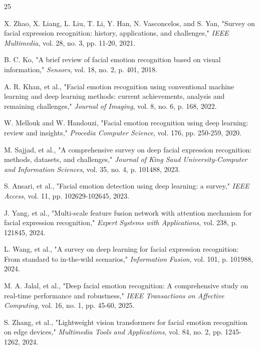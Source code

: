 \documentclass[journal]{IEEEtran}
\begin{document}
\begin{thebibliography}{25}

X. Zhao, X. Liang, L. Liu, T. Li, Y. Han, N. Vasconcelos, and S. Yan, "Survey on facial expression recognition: history, applications, and challenges," \textit{IEEE Multimedia}, vol. 28, no. 3, pp. 11-20, 2021.

B. C. Ko, "A brief review of facial emotion recognition based on visual information," \textit{Sensors}, vol. 18, no. 2, p. 401, 2018.

A. R. Khan, et al., "Facial emotion recognition using conventional machine learning and deep learning methods: current achievements, analysis and remaining challenges," \textit{Journal of Imaging}, vol. 8, no. 6, p. 168, 2022.

W. Mellouk and W. Handouzi, "Facial emotion recognition using deep learning: review and insights," \textit{Procedia Computer Science}, vol. 176, pp. 250-259, 2020.

M. Sajjad, et al., "A comprehensive survey on deep facial expression recognition: methods, datasets, and challenges," \textit{Journal of King Saud University-Computer and Information Sciences}, vol. 35, no. 4, p. 101488, 2023.

S. Ansari, et al., "Facial emotion detection using deep learning: a survey," \textit{IEEE Access}, vol. 11, pp. 102629-102645, 2023.

J. Yang, et al., "Multi-scale feature fusion network with attention mechanism for facial expression recognition," \textit{Expert Systems with Applications}, vol. 238, p. 121845, 2024.

L. Wang, et al., "A survey on deep learning for facial expression recognition: From standard to in-the-wild scenarios," \textit{Information Fusion}, vol. 101, p. 101988, 2024.

M. A. Jalal, et al., "Deep facial emotion recognition: A comprehensive study on real-time performance and robustness," \textit{IEEE Transactions on Affective Computing}, vol. 16, no. 1, pp. 45-60, 2025.

S. Zhang, et al., "Lightweight vision transformers for facial emotion recognition on edge devices," \textit{Multimedia Tools and Applications}, vol. 84, no. 2, pp. 1245-1262, 2024.


\end{thebibliography}
\end{document}
